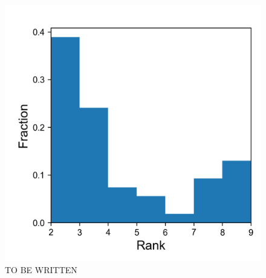 \documentclass[11pt, titlepage, twoside]{article}
\begin{document}
\begin{figure}[htbp]
\centering
\includegraphics[keepaspectratio,width=\textwidth,height=0.75\textheight]{hist_label_second.png}
\caption[]{TO BE WRITTEN}\label{hist_label_second}
\end{figure}


\end{document}
